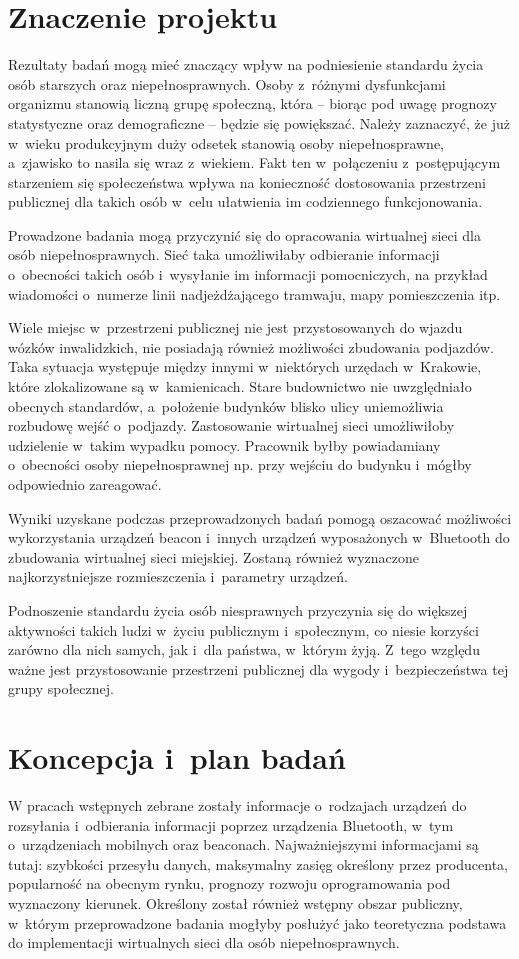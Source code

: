 \documentclass[a4paper]{article}
\begin{document}
\section{Znaczenie projektu}
Rezultaty badań mogą mieć znaczący wpływ na podniesienie standardu życia osób starszych oraz niepełnosprawnych. Osoby z~różnymi dysfunkcjami organizmu stanowią liczną grupę społeczną, która -- biorąc pod uwagę prognozy statystyczne oraz demograficzne -- będzie się powiększać. Należy zaznaczyć, że już w~wieku produkcyjnym duży odsetek stanowią osoby niepełnosprawne, a~zjawisko to nasila się wraz z~wiekiem. Fakt ten w~połączeniu z~postępującym starzeniem się społeczeństwa wpływa na konieczność dostosowania przestrzeni publicznej dla takich osób w~celu ułatwienia im codziennego funkcjonowania. 

Prowadzone badania mogą przyczynić się do opracowania wirtualnej sieci dla osób niepełnosprawnych. Sieć taka umożliwiłaby odbieranie informacji o~obecności takich osób i~wysyłanie im informacji pomocniczych, na przykład wiadomości o~numerze linii nadjeżdżającego tramwaju, mapy pomieszczenia itp. 

Wiele miejsc w~przestrzeni publicznej nie jest przystosowanych do wjazdu wózków inwalidzkich, nie posiadają również możliwości zbudowania podjazdów. Taka sytuacja występuje między innymi w~niektórych urzędach w~Krakowie, które zlokalizowane są w~kamienicach. Stare budownictwo nie uwzględniało obecnych standardów, a~położenie budynków blisko ulicy uniemożliwia rozbudowę wejść o~podjazdy. Zastosowanie wirtualnej sieci umożliwiłoby udzielenie w~takim wypadku pomocy. Pracownik byłby powiadamiany o~obecności osoby niepełnosprawnej np. przy wejściu do budynku i~mógłby odpowiednio zareagować.

Wyniki uzyskane podczas przeprowadzonych badań pomogą oszacować możliwości wykorzystania urządzeń beacon i~innych urządzeń wyposażonych w~Bluetooth do zbudowania wirtualnej sieci miejskiej. Zostaną również wyznaczone najkorzystniejsze rozmieszczenia i~parametry urządzeń.

Podnoszenie standardu życia osób niesprawnych przyczynia się do większej aktywności takich ludzi w~życiu publicznym i~społecznym, co niesie korzyści zarówno dla nich samych, jak i~dla państwa, w~którym żyją. Z~tego względu ważne jest przystosowanie przestrzeni publicznej dla wygody i~bezpieczeństwa tej grupy społecznej.

\section{Koncepcja i~plan badań}
W pracach wstępnych zebrane zostały informacje o~rodzajach urządzeń do rozsyłania i~odbierania informacji poprzez urządzenia Bluetooth, w~tym o~urządzeniach mobilnych oraz beaconach. Najważniejszymi informacjami są tutaj: szybkości przesyłu danych, maksymalny zasięg określony przez producenta, popularność na obecnym rynku, prognozy rozwoju oprogramowania pod wyznaczony kierunek. Określony został również wstępny obszar publiczny, w~którym przeprowadzone badania mogłyby posłużyć jako teoretyczna podstawa do implementacji wirtualnych sieci dla osób niepełnosprawnych.
\end{document}
